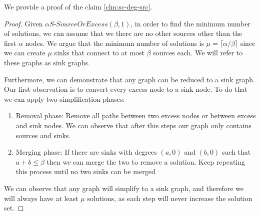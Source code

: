 We provide a proof of the claim \ref{clm:sc-deg-src}.
\begin{proof}
    Given $\alpha\textit{S-SourceOrExcess}(\beta,1)$, in order to find
    the minimum number of solutions, we can assume that we there are no other sources other than the first $\alpha$ nodes.
    We argue that the minimum number of solutions is $\mu = \lceil \alpha/\beta \rceil$ since we can create 
    $\mu$ sinks that connect to at most $\beta$ sources each. We will refer to these
    graphs as sink graphs.

    Furthermore, we can demonstrate that any graph can be reduced to a sink graph.
    Our first observation is to convert every excess node to a sink node. To do that we can apply two simplification 
    phases:
    \begin{enumerate}
        \item Removal phase: Remove all paths between two excess nodes or between excess and sink nodes.
        We can observe that after this steps our graph only contains sources and sinks.
        \item Merging phase: If there are sinks with degrees $(a,0)$ and $(b,0)$ such that
        $a + b \leq \beta$ then we can merge the two to remove a solution. Keep repeating this process until
        no two sinks can be merged
    \end{enumerate}
    We can observe that any graph will simplify to a sink graph, and therefore we will always have at least $\mu$ solutions,
    as each step will never increase the solution set.
\end{proof}